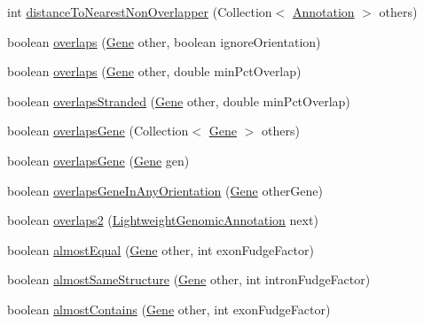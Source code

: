 \begin{DoxyCompactItemize}
\item 
int \hyperlink{classumms_1_1core_1_1annotation_1_1_gene_ae729cd55ef7399dd7e9bd3158d4ed60a}{distance\+To\+Nearest\+Non\+Overlapper} (Collection$<$ \hyperlink{interfaceumms_1_1core_1_1annotation_1_1_annotation}{Annotation} $>$ others)
\item 
boolean \hyperlink{classumms_1_1core_1_1annotation_1_1_gene_aebfd67dc85451aee747df4eaa21e5cf6}{overlaps} (\hyperlink{classumms_1_1core_1_1annotation_1_1_gene}{Gene} other, boolean ignore\+Orientation)
\item 
boolean \hyperlink{classumms_1_1core_1_1annotation_1_1_gene_ae3f679245171e936786dc8557a42a595}{overlaps} (\hyperlink{classumms_1_1core_1_1annotation_1_1_gene}{Gene} other, double min\+Pct\+Overlap)
\item 
boolean \hyperlink{classumms_1_1core_1_1annotation_1_1_gene_a54b34b8b06efc355b3a0c0d7a4291d46}{overlaps\+Stranded} (\hyperlink{classumms_1_1core_1_1annotation_1_1_gene}{Gene} other, double min\+Pct\+Overlap)
\item 
boolean \hyperlink{classumms_1_1core_1_1annotation_1_1_gene_a717a99b3a0cd669e42b6228b7eb792d6}{overlaps\+Gene} (Collection$<$ \hyperlink{classumms_1_1core_1_1annotation_1_1_gene}{Gene} $>$ others)
\item 
boolean \hyperlink{classumms_1_1core_1_1annotation_1_1_gene_ac6baca43bb8c0d589ee20dca51cc249e}{overlaps\+Gene} (\hyperlink{classumms_1_1core_1_1annotation_1_1_gene}{Gene} gen)
\item 
boolean \hyperlink{classumms_1_1core_1_1annotation_1_1_gene_a776ce11b119e43d0cfaefd520f372d83}{overlaps\+Gene\+In\+Any\+Orientation} (\hyperlink{classumms_1_1core_1_1annotation_1_1_gene}{Gene} other\+Gene)
\item 
boolean \hyperlink{classumms_1_1core_1_1annotation_1_1_gene_a5a004233c6724ab80d41e9a38e0e254e}{overlaps2} (\hyperlink{interfacebroad_1_1core_1_1annotation_1_1_lightweight_genomic_annotation}{Lightweight\+Genomic\+Annotation} next)
\item 
boolean \hyperlink{classumms_1_1core_1_1annotation_1_1_gene_a9fc05320597a113c87a9ecc90e4917d5}{almost\+Equal} (\hyperlink{classumms_1_1core_1_1annotation_1_1_gene}{Gene} other, int exon\+Fudge\+Factor)
\item 
boolean \hyperlink{classumms_1_1core_1_1annotation_1_1_gene_ac5bdb2ada80eba3478de31a40cb42da4}{almost\+Same\+Structure} (\hyperlink{classumms_1_1core_1_1annotation_1_1_gene}{Gene} other, int intron\+Fudge\+Factor)
\item 
boolean \hyperlink{classumms_1_1core_1_1annotation_1_1_gene_af8dd9eb64b202aabf20b0c41dc181352}{almost\+Contains} (\hyperlink{classumms_1_1core_1_1annotation_1_1_gene}{Gene} other, int exon\+Fudge\+Factor)

\end{DoxyCompactItemize}
